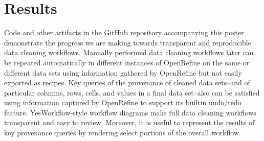 \section{Results}

Code and other artifacts in the GitHub repository accompanying this poster demonstrate the progress we are making towards transparent and reproducible data cleaning workflows. Manually performed data cleaning workflows later can be repeated automatically in different instances of OpenRefine on the same or different data sets using information gathered by OpenRefine but not easily exported as recipes. Key queries of the provenance of cleaned data sets--and of particular columns, rows, cells, and values in a final data set--also can be satisfied using information captured by OpenRefine to support its builtin undo/redo feature. YesWorkflow-style workflow diagrams make full data cleaning workflows transparent and easy to review. Moreover, it is useful to represent the results of key provenance queries by rendering select portions of the overall workflow.